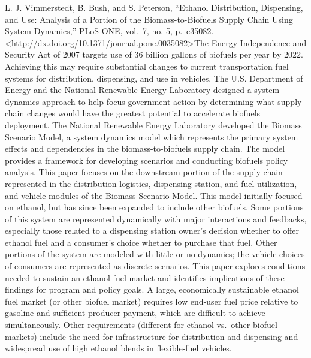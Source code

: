 \documentclass[]{article}
\begin{document}
L. J. Vimmerstedt, B. Bush, and S. Peterson, ``Ethanol Distribution,
Dispensing, and Use: Analysis of a Portion of the Biomass-to-Biofuels
Supply Chain Using System Dynamics,'' PLoS ONE, vol.~7, no. 5,
p.~e35082.
\textless{}http://dx.doi.org/10.1371/journal.pone.0035082\textgreater{}The
Energy Independence and Security Act of 2007 targets use of 36 billion
gallons of biofuels per year by 2022. Achieving this may require
substantial changes to current transportation fuel systems for
distribution, dispensing, and use in vehicles. The U.S. Department of
Energy and the National Renewable Energy Laboratory designed a system
dynamics approach to help focus government action by determining what
supply chain changes would have the greatest potential to accelerate
biofuels deployment. The National Renewable Energy Laboratory developed
the Biomass Scenario Model, a system dynamics model which represents the
primary system effects and dependencies in the biomass-to-biofuels
supply chain. The model provides a framework for developing scenarios
and conducting biofuels policy analysis. This paper focuses on the
downstream portion of the supply chain--represented in the distribution
logistics, dispensing station, and fuel utilization, and vehicle modules
of the Biomass Scenario Model. This model initially focused on ethanol,
but has since been expanded to include other biofuels. Some portions of
this system are represented dynamically with major interactions and
feedbacks, especially those related to a dispensing station owner's
decision whether to offer ethanol fuel and a consumer's choice whether
to purchase that fuel. Other portions of the system are modeled with
little or no dynamics; the vehicle choices of consumers are represented
as discrete scenarios. This paper explores conditions needed to sustain
an ethanol fuel market and identifies implications of these findings for
program and policy goals. A large, economically sustainable ethanol fuel
market (or other biofuel market) requires low end-user fuel price
relative to gasoline and sufficient producer payment, which are
difficult to achieve simultaneously. Other requirements (different for
ethanol vs.~other biofuel markets) include the need for infrastructure
for distribution and dispensing and widespread use of high ethanol
blends in flexible-fuel vehicles.
\end{document}
